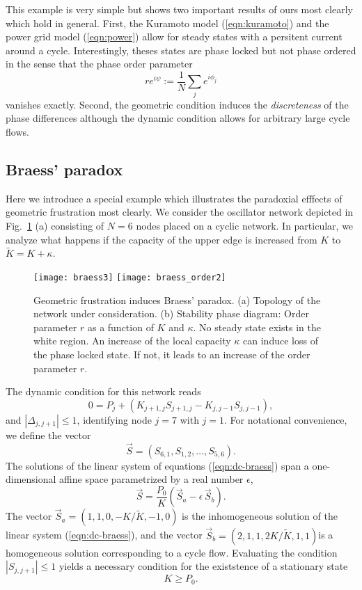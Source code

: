 \documentclass[10pt,aps,pra,twocolumn,superscriptaddress]{revtex4-1}
\newcommand{\be}{\begin{equation}}
\newcommand{\ee}{\end{equation}}
\begin{document}
This example is very simple but shows two important results
of ours most clearly which hold in general.
First, the Kuramoto model (\ref{eqn:kuramoto})
and the power grid model (\ref{eqn:power}) allow for 
steady states with a persitent current around a cycle.
Interestingly, theses states are phase locked but not phase
ordered in the sense that the phase order parameter
\be
   r e^{i \psi} := \frac{1}{N} \sum_j e^{i \phi_j} 
   \label{eqn:deforder}
\ee
vanishes exactly.
Second, the geometric condition induces the 
\emph{discreteness} of the phase differences
although the dynamic condition allows for arbitrary
large cycle flows.

\subsection{Braess' paradox}
\label{sec:braess}

Here we introduce a special example which illustrates the
paradoxial efffects of geometric frustration most clearly.
We consider the oscillator network depicted in Fig.~\ref{fig:braess} (a)
consisting of $N=6$ nodes placed on a cyclic network.
In particular, we analyze what happens if the capacity
of the upper edge is increased from $K$ to 
$\tilde K = K + \kappa$. 


\begin{figure}[tb]
\centering
\texttt{[image: braess3]}
\texttt{[image: braess\_order2]}
\caption{\label{fig:braess}
Geometric frustration induces Braess' paradox.
(a) Topology of the network under consideration.
(b) Stability phase diagram: Order parameter $r$ 
as a function of $K$ and $\kappa$. No steady state exists 
in the white region. 
An increase of the local capacity $\kappa$ 
can induce loss of the phase locked state.
If not, it leads to an increase of the order parameter 
$r$.
}
\end{figure}

The dynamic condition for this network reads
\be
   0 = P_j + ( K_{j+1,j} S_{j+1,j}  - K_{j,j-1} S_{j,j-1} ),
  \label{eqn:dc-braess}
\ee
and $|\Delta_{j,j+1}| \le 1$, identifying node $j=7$ with $j=1$.
 For notational convenience,
we define the vector 
\be
   \vec S = (S_{6,1} ,S_{1,2}, \ldots, S_{5,6} ).
\ee
The solutions of the linear system of equations (\ref{eqn:dc-braess}) 
span a one-dimensional affine space parametrized by a real 
number $\epsilon$,
\be
   \vec S = \frac{P_0}{K} 
      \left( \vec S_a - \epsilon \, \vec S_b \right).
   \label{eqn:SaSb2}
\ee
The vector $\vec S_a = (1,1,0,-K/\tilde K,-1, 0)$ is the 
inhomogeneous solution of the linear system (\ref{eqn:dc-braess}), 
and the vector $\vec S_b = (2,1,1,2K/\tilde K,1,1)$is a homogeneous 
solution corresponding to a cycle flow.
Evaluating the condition $|S_{j,j+1}| \le 1$ yields
a necessary condition for the existstence of a stationary state
\be
     K \ge P_0.
\ee
\end{document}
